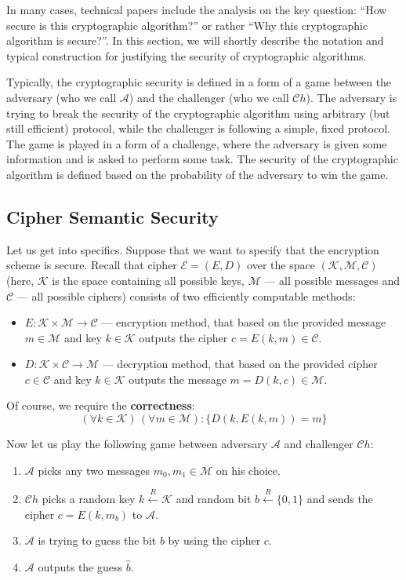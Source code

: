 \documentclass[../lecture-notes-148x210.tex]{subfiles}
\begin{document}
In many cases, technical papers include the analysis on the key question: ``How secure is this cryptographic algorithm?'' or rather ``Why this cryptographic algorithm is secure?''. In this section, we will shortly describe the notation and typical construction for justifying the security of cryptographic algorithms.

Typically, the cryptographic security is defined in a form of a game between the adversary (who we call $\mathcal{A}$) and the challenger (who we call $\mathcal{C}h$). The adversary is trying to break the security of the cryptographic algorithm using arbitrary (but still efficient) protocol, while the challenger is following a simple, fixed protocol. The game is played in a form of a challenge, where the adversary is given some information and is asked to perform some task. The security of the cryptographic algorithm is defined based on the probability of the adversary to win the game.

\subsection{Cipher Semantic Security}
Let us get into specifics. Suppose that we want to specify that the encryption scheme is secure. Recall that 
cipher $\mathcal{E} = (E,D)$ over the space $(\mathcal{K}, \mathcal{M}, \mathcal{C})$ (here, $\mathcal{K}$ is 
the space containing all possible keys, $\mathcal{M}$ --- all possible messages and $\mathcal{C}$ --- all 
possible ciphers) consists of two efficiently computable methods:
\begin{itemize}
    \item $E: \mathcal{K} \times \mathcal{M} \to \mathcal{C}$ --- encryption method, that based on the provided message $m \in \mathcal{M}$ and key $k \in \mathcal{K}$ outputs the cipher $c = E(k,m) \in \mathcal{C}$.
    \item $D: \mathcal{K} \times \mathcal{C} \to \mathcal{M}$ --- decryption method, that based on the provided cipher $c \in \mathcal{C}$ and key $k \in \mathcal{K}$ outputs the message $m = D(k,c) \in \mathcal{M}$.
\end{itemize}

Of course, we require the \textbf{correctness}:
\begin{equation*}
    (\forall k \in \mathcal{K}) \, (\forall m \in \mathcal{M}): \{D(k,E(k,m)) = m\}
\end{equation*}

Now let us play the following game between adversary $\mathcal{A}$ and challenger $\mathcal{C}h$:
\begin{enumerate}
    \item $\mathcal{A}$ picks any two messages $m_0,m_1 \in \mathcal{M}$ on his choice.
    \item $\mathcal{C}h$ picks a random key $k \xleftarrow{R} \mathcal{K}$ and random bit $b \xleftarrow{R} \{0,1\}$ and sends the cipher $c = E(k,m_b)$ to $\mathcal{A}$.
    \item $\mathcal{A}$ is trying to guess the bit $b$ by using the cipher $c$.
    \item $\mathcal{A}$ outputs the guess $\hat{b}$.
\end{enumerate}
\end{document}
